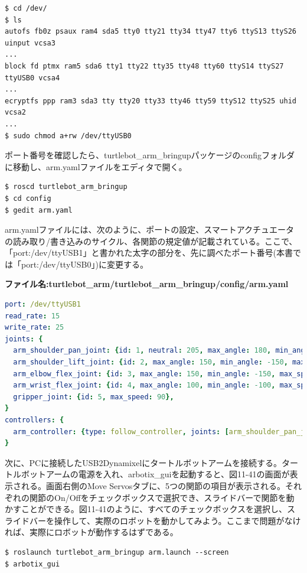 \begin{lstlisting}[language=ROS]
$ cd /dev/
$ ls
autofs fb0z psaux ram4 sda5 tty0 tty21 tty34 tty47 tty6 ttyS13 ttyS26 uinput vcsa3
...
block fd ptmx ram5 sda6 tty1 tty22 tty35 tty48 tty60 ttyS14 ttyS27 ttyUSB0 vcsa4
...
ecryptfs ppp ram3 sda3 tty tty20 tty33 tty46 tty59 ttyS12 ttyS25 uhid vcsa2
...
$ sudo chmod a+rw /dev/ttyUSB0
\end{lstlisting}

ポート番号を確認したら、turtlebot\_arm\_bringupパッケージのconfigフォルダに移動し、arm.yamlファイルをエディタで開く。

\begin{lstlisting}[language=ROS]
$ roscd turtlebot_arm_bringup
$ cd config
$ gedit arm.yaml
\end{lstlisting}

arm.yamlファイルには、次のように、ポートの設定、スマートアクチュエータの読み取り/書き込みのサイクル、各関節の規定値が記載されている。ここで、「port:/dev/ttyUSB1」と書かれた太字の部分を、先に調べたポート番号(本書では「port:/dev/ttyUSB0」)に変更する。

\textbf{ファイル名:turtlebot\_arm/turtlebot\_arm\_bringup/config/arm.yaml}
\begin{lstlisting}[language=YAML]
port: /dev/ttyUSB1
read_rate: 15
write_rate: 25
joints: {
  arm_shoulder_pan_joint: {id: 1, neutral: 205, max_angle: 180, min_angle: -60, max_speed: 90},
  arm_shoulder_lift_joint: {id: 2, max_angle: 150, min_angle: -150, max_speed: 90},
  arm_elbow_flex_joint: {id: 3, max_angle: 150, min_angle: -150, max_speed: 90},
  arm_wrist_flex_joint: {id: 4, max_angle: 100, min_angle: -100, max_speed: 90},
  gripper_joint: {id: 5, max_speed: 90},
}
controllers: {
  arm_controller: {type: follow_controller, joints: [arm_shoulder_pan_joint, arm_shoulder_lift_joint, arm_elbow_flex_joint, arm_wrist_flex_joint], action_name: arm_controller/follow_joint_trajectory, onboard: False }
}
\end{lstlisting}

次に、PCに接続したUSB2Dynamixelにタートルボットアームを接続する。タートルボットアームの電源を入れ、arbotix\_guiを起動すると、図11-41の画面が表示される。画面右側のMove Servosタブに、5つの関節の項目が表示される。それぞれの関節のOn/Offをチェックボックスで選択でき、スライドバーで関節を動かすことができる。図11-41のように、すべてのチェックボックスを選択し、スライドバーを操作して、実際のロボットを動かしてみよう。ここまで問題がなければ、実際にロボットが動作するはずである。

\begin{lstlisting}[language=ROS]
$ roslaunch turtlebot_arm_bringup arm.launch --screen
$ arbotix_gui
\end{lstlisting}

